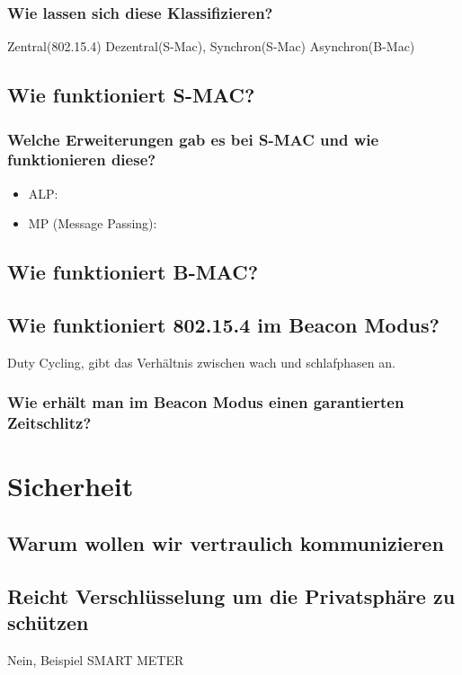 		\subsubsection{Wie lassen sich diese Klassifizieren?}
		Zentral(802.15.4) Dezentral(S-Mac), Synchron(S-Mac) Asynchron(B-Mac) %
		
	\subsection{Wie funktioniert S-MAC?}
	
	\subsubsection{Welche Erweiterungen gab es bei S-MAC und wie funktionieren diese?}
		\begin{itemize}
			\item ALP:
			\item MP (Message Passing):
		\end{itemize}
		
	\subsection{Wie funktioniert B-MAC?}
	
	\subsection{Wie funktioniert 802.15.4 im Beacon Modus?}
	Duty Cycling, gibt das Verhältnis zwischen wach und schlafphasen an.
	\subsubsection{Wie erhält man im Beacon Modus einen garantierten Zeitschlitz?}
	
	


\section{Sicherheit}
	\subsection{Warum wollen wir vertraulich kommunizieren}
	
	\subsection{Reicht Verschlüsselung um die Privatsphäre zu schützen}
	Nein, Beispiel SMART\- METER
